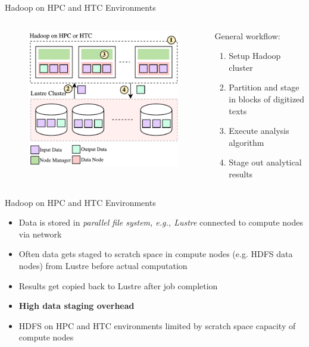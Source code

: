 \documentclass[newPxFont]{beamer}
\begin{document}
\begin{frame}[c]{Hadoop on HPC and HTC Environments}
\begin{columns}[T] %
\begin{column}{.48\textwidth}
\begin{figure}[t]
  \includegraphics[scale=0.5]{hadoop-on-hpc}
  \centering
\end{figure}
\end{column}%
\hfill%
\begin{column}{.48\textwidth}
General workflow:
\begin{enumerate}
  \item Setup Hadoop cluster
  \item Partition and stage in blocks of digitized texts
  \item Execute analysis algorithm
  \item Stage out analytical results
\end{enumerate}
\end{column}%
\end{columns}

\end{frame}

\begin{frame}[c]{Hadoop on HPC and HTC Environments}
  \begin{itemize}
    \item Data is stored in \emph{parallel file system, e.g., Lustre} connected to compute nodes via network
    \item Often data gets staged to scratch space in compute nodes (e.g. HDFS data nodes) from Lustre before actual computation
    \item Results get copied back to Lustre after job completion
    \item \textbf{High data staging overhead}
    \item HDFS on HPC and HTC environments limited by scratch space capacity of compute nodes
  \end{itemize}
\end{frame}
\end{document}
